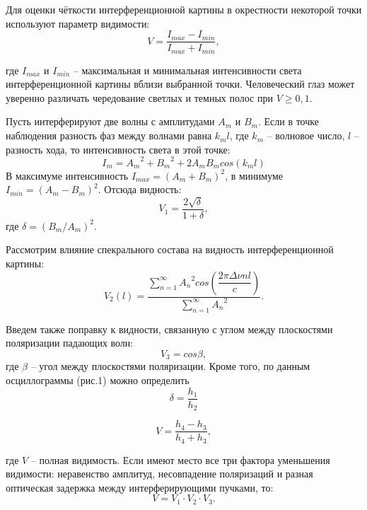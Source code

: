 \documentclass[a4paper,12pt]{article}
\begin{document}
Для оценки чёткости интерференционной картины в окрестности некоторой точки используют параметр видимости:
\begin{equation}
\label{eq:seen}
V=\dfrac{I_{max}-I_{min}}{I_{max}+I_{min}},
\end{equation}

где $I_{max}$ и $I_{min}$ -- максимальная и минимальная интенсивности света интерференционной картины вблизи выбранной точки. Человеческий глаз может уверенно различать чередование светлых и темных полос при $V \geq 0,1$. 

Пусть интерферируют две волны с амплитудами $A_{m}$ и $B_{m}$. Если в точке наблюдения разность фаз между волнами равна $k_{m} l$, где $k_{m}$ -- волновое число, $l$ -- разность хода, то интенсивность света в этой точке:
\begin{equation}
\label{eq:intensity}
I_{m} = {A_{m}}^2+{B_{m}}^2+2 A_{m} B_{m} cos(k_{m}l)
\end{equation} 
В максимуме интенсивность $I_{max} = (A_{m}+B_{m})^2$, в минимуме $I_{min} = (A_{m}-B_{m})^2.$ Отсюда видность:
\begin{equation}
\label{eq:seen1}
V_{1} = \dfrac{2 \sqrt{\delta}}{1+\delta},
\end{equation}
где $\delta = (B_{m}/A_{m})^2$.

Рассмотрим влияние спекрального состава на видность интерференционной картины:
\begin{equation}
V_{2}(l) = \dfrac{\sum_{n=1}^{\infty} {A_{n}}^2 cos(\dfrac{2 \pi \Delta \nu n l}{c})}{\sum_{n=1}^{\infty}{A_{n}}^2}.
\end{equation}

Введем также поправку к видности, связанную с углом между плоскостями поляризации падающих волн:
\begin{equation}
V_{3} = cos \beta,
\end{equation}
где $\beta$ -- угол между плоскостями поляризации.
Кроме того, по данным осциллограммы (рис.1) можно определить
\begin{equation}
\delta = \dfrac{h_{1}}{h_{2}}
\end{equation}

\begin{equation}
V = \dfrac{h_{4}-h_{3}}{h_{4}+h_{3}},
\end{equation}

где $V$ -- полная видимость. Если имеют место все три фактора уменьшения видимости: неравенство амплитуд, несовпадение поляризаций и разная оптическая задержка между интерферирующими пучками, то:
\begin{equation}
V = V_{1} \cdot V_{2} \cdot V_{3}.
\end{equation}	
	
\end{document}
